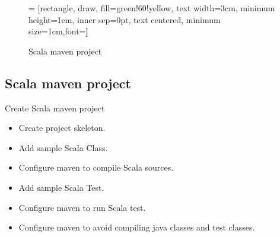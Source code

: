 \documentclass[aspectratio=169]{beamer}
\begin{document}
    \begin{frame}
        \begin{figure}
             = [rectangle, draw, fill=green!60!yellow, text width=3cm,
            minimum height=1em,
            inner sep=0pt,
            text centered, minimum size=1cm,font=\bfseries]

            \caption{Scala maven project} \label{fig:M1}
        \end{figure}
    \end{frame}
    \subsection{Scala maven project}\label{subsec:scala-maven-project}
    \begin{frame}{Create Scala maven project}
        \begin{itemize}[<+- | alert@+>]
            \item Create project skeleton.
            \item Add sample Scala Class.
            \item Configure maven to compile Scala sources.
            \item Add sample Scala Test.
            \item Configure maven to run Scala test.
            \item Configure maven to avoid compiling java classes and test classes.
        \end{itemize}
    \end{frame}
\end{document}
